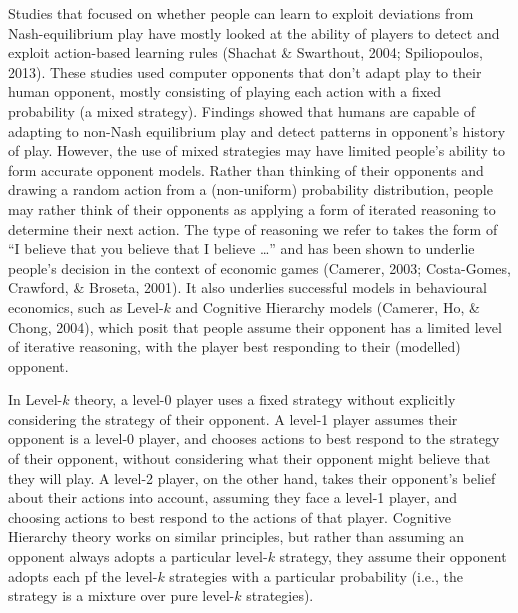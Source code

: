 \documentclass[man,floatsintext]{apa6}
\begin{document}
Studies that focused on whether people can learn to exploit deviations from Nash-equilibrium play have mostly looked at the ability of players to detect and exploit action-based learning rules (Shachat \& Swarthout, 2004; Spiliopoulos, 2013). These studies used computer opponents that don't adapt play to their human opponent, mostly consisting of playing each action with a fixed probability (a mixed strategy). Findings showed that humans are capable of adapting to non-Nash equilibrium play and detect patterns in opponent's history of play. However, the use of mixed strategies may have limited people's ability to form accurate opponent models.
Rather than thinking of their opponents and drawing a random action from a (non-uniform) probability distribution, people may rather think of their opponents as applying a form of iterated reasoning to determine their next action. The type of reasoning we refer to takes the form of ``I believe that you believe that I believe \ldots{}'' and has been shown to underlie people's decision in the context of economic games (Camerer, 2003; Costa-Gomes, Crawford, \& Broseta, 2001). It also underlies successful models in behavioural economics, such as Level-\(k\) and Cognitive Hierarchy models (Camerer, Ho, \& Chong, 2004), which posit that people assume their opponent has a limited level of iterative reasoning, with the player best responding to their (modelled) opponent.

In Level-\(k\) theory, a level-0 player uses a fixed strategy without explicitly considering the strategy of their opponent. A level-1 player assumes their opponent is a level-0 player, and chooses actions to best respond to the strategy of their opponent, without considering what their opponent might believe that they will play. A level-2 player, on the other hand, takes their opponent's belief about their actions into account, assuming they face a level-1 player, and choosing actions to best respond to the actions of that player. Cognitive Hierarchy theory works on similar principles, but rather than assuming an opponent always adopts a particular level-\(k\) strategy, they assume their opponent adopts each pf the level-\(k\) strategies with a particular probability (i.e., the strategy is a mixture over pure level-\(k\) strategies).
\end{document}
